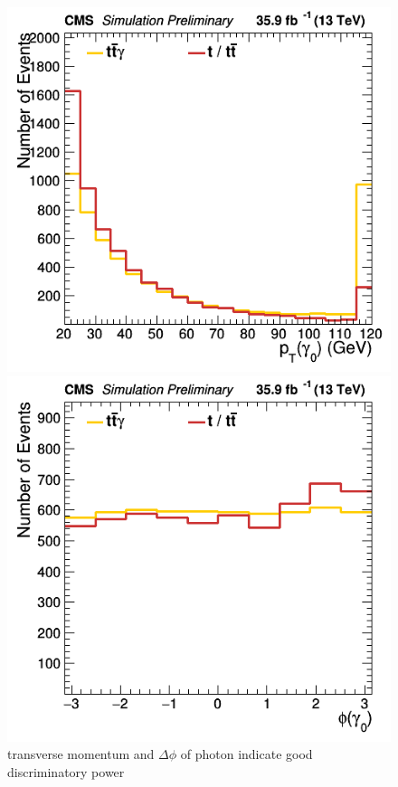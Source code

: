 \documentclass[11pt]{scrartcl}
\begin{document}
	\begin{figure}[H]
	\centering
	\begin{minipage}{.5\textwidth}
	  \centering
	  \includegraphics[width=0.70\linewidth]{figures/Select3/PhotonGood0_pt.png}
	\end{minipage}%
	\begin{minipage}{.5\textwidth}
	  \centering
	  \includegraphics[width=0.70\linewidth]{figures/Select3/PhotonGood0_phi.png}
	\end{minipage}
	\caption{transverse momentum and $\Delta\phi$ of photon indicate good discriminatory power}
	\label{fig:PhotonGood0pt}
	\end{figure}
	
\end{document}
